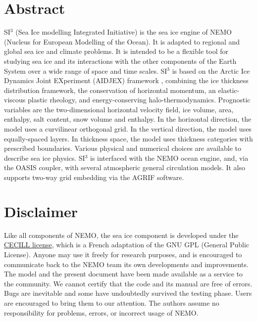 \documentclass[../main/SI3_manual]{subfiles}
\begin{document}

\chapter*{Abstract}

SI$^3$ (Sea Ice modelling Integrated Initiative) is the sea ice engine of NEMO (Nucleus for European Modelling of the Ocean). It is adapted to regional and global sea ice and climate problems. It is intended to be a flexible tool for studying sea ice and its interactions with the other components of the Earth System over a wide range of space and time scales. SI$^3$ is based on the Arctic Ice Dynamics Joint EXperiment (AIDJEX) framework \citep{coon_1974}, combining the ice thickness distribution framework, the conservation of horizontal momentum, an elastic-viscous plastic rheology, and energy-conserving halo-thermodynamics. Prognostic variables are the two-dimensional horizontal velocity field, ice volume, area, enthalpy, salt content, snow volume and enthalpy. In the horizontal direction, the model uses a curvilinear orthogonal grid. In the vertical direction, the model uses equally-spaced layers. In thickness space, the model uses thickness categories with prescribed boundaries. Various physical and numerical choices are available to describe sea ice physics. SI$^3$ is interfaced with the NEMO ocean engine, and, via the OASIS coupler, with several atmospheric general circulation models. It also supports two-way grid embedding via the AGRIF software.


{\small
} 

\chapter*{Disclaimer}

Like all components of NEMO, the sea ice component is developed under the \href{http://www.cecill.info/}{CECILL license}, 
which is a French adaptation of the GNU GPL (General Public License). Anyone may use it 
freely for research purposes, and is encouraged to communicate back to the NEMO team 
its own developments and improvements. The model and the present document have been 
made available as a service to the community. We cannot certify that the code and its manual 
are free of errors. Bugs are inevitable and some have undoubtedly survived the testing phase. 
Users are encouraged to bring them to our attention. The authors assume no responsibility 
for problems, errors, or incorrect usage of NEMO.
\end{document}
